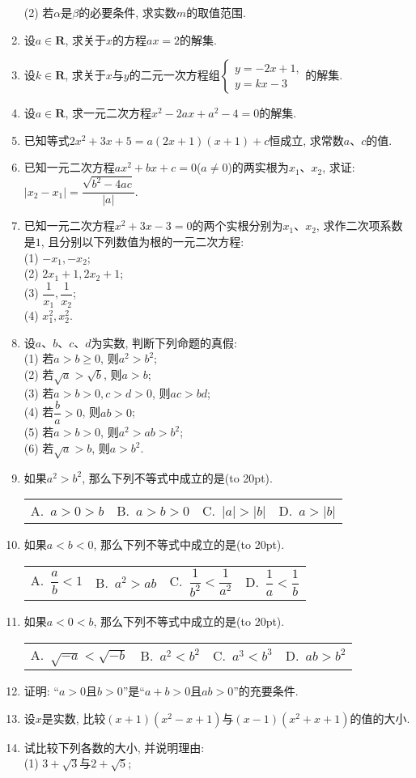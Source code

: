\documentclass[10pt,a4paper]{article}
\newcommand{\bracket}[1]{(\hbox to #1pt{})}
\newcommand{\fourch}[4]{\par\begin{tabular}{p{.23\textwidth}p{.23\textwidth}p{.23\textwidth}p{.23\textwidth}}
A.~#1 &B.~#2& C.~#3& D.~#4
\end{tabular}}
\begin{document}
\begin{enumerate}[1.]
(2) 若$\alpha$是$\beta$的必要条件, 求实数$m$的取值范围. 
\item 设$a\in \mathbf{R}$, 求关于$x$的方程$ax=2$的解集.
\item 设$k\in \mathbf{R}$, 求关于$x$与$y$的二元一次方程组$\begin{cases}y=-2x+1,\\  y=kx-3\end{cases}$的解集.
\item 设$a\in \mathbf{R}$, 求一元二次方程$x^2-2ax+a^2-4=0$的解集.
\item 已知等式$2x^2+3x+5=a(2x+1)(x+1)+c$恒成立, 求常数$a$、$c$的值.
\item 已知一元二次方程$ax^2+bx+c=0$($a\ne 0$)的两实根为$x_1$、$x_2$, 求证: $|x_2-x_1| = \dfrac{\sqrt{b^2-4 ac}}{|a|}$.
\item 已知一元二次方程$x^2+3x-3=0$的两个实根分别为$x_1$、$x_2$, 求作二次项系数是$1$, 且分别以下列数值为根的一元二次方程:\\
(1) $-x_1, -x_2$;\\
(2) $2x_1+1, 2x_2+1$;\\
(3) $\dfrac 1{x_1}, \dfrac 1{x_2}$;\\
(4) $x_1^2, x_2^2$.
\item 设$a$、$b$、$c$、$d$为实数, 判断下列命题的真假:\\
(1) 若$a>b\ge 0$, 则$a^2>b^2$;\\
(2) 若$\sqrt a>\sqrt b$, 则$a>b$;\\
(3) 若$a>b>0, c>d>0$, 则$ac>bd$;\\
(4) 若$\dfrac ba>0$, 则$ab>0$;\\
(5) 若$a>b>0$, 则$a^2>ab>b^2$;\\
(6) 若$\sqrt a>b$, 则$a>b^2$.
\item 如果$a^2>b^2$, 那么下列不等式中成立的是\bracket{20}.
\fourch{$a>0>b$}{$a>b>0$}{$|a|>|b|$}{$a>|b|$}
\item 如果$a<b<0$, 那么下列不等式中成立的是\bracket{20}.
\fourch{$\dfrac ab<1$}{$a^2>ab$}{$\dfrac1{b^2}<\dfrac 1{a^2}$}{$\dfrac 1a<\dfrac 1b$}
\item 如果$a<0<b$, 那么下列不等式中成立的是\bracket{20}.
\fourch{$\sqrt{-a}<\sqrt{-b}$}{$a^2<b^2$}{$a^3<b^3$}{$ab>b^2$}
\item 证明: ``$a>0$且$b>0$''是``$a+b>0$且$ab>0$''的充要条件.
\item 设$x$是实数, 比较$(x+1)(x^2-x+1)$与$(x-1)(x^2+x+1)$的值的大小.
\item 试比较下列各数的大小, 并说明理由:\\
(1) $3+\sqrt 3$与$2+\sqrt 5$;\\

\end{enumerate}
\end{document}
